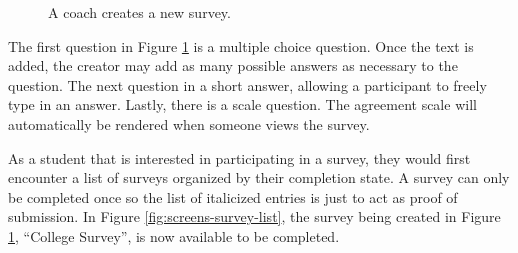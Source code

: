 \begin{figure}[p!]
	\centering
	\caption{A coach creates a new survey.}
	\label{fig:screens-survey-new}
\end{figure}

The first question in Figure \ref{fig:screens-survey-new} is a multiple choice question. Once the text is added, the creator may add as many possible answers as necessary to the question. The next question in a short answer, allowing a participant to freely type in an answer. Lastly, there is a scale question. The agreement scale will automatically be rendered when someone views the survey.

As a student that is interested in participating in a survey, they would first encounter a list of  surveys organized by their completion state. A survey can only be completed once so the list of italicized entries is just to act as proof of submission. In Figure \ref{fig:screens-survey-list}, the survey being created in Figure \ref{fig:screens-survey-new}, ``College Survey'', is now available to be completed.

